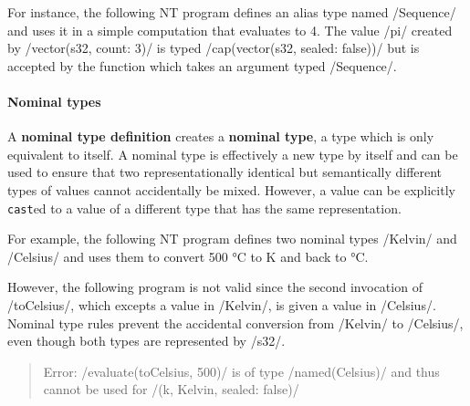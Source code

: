 \documentclass[main.tex]{subfiles}
\begin{document}
For instance, the following NT program defines an alias type named \iil/Sequence/ and uses it in a simple computation that evaluates to 4. The value \iil/pi/ created by \iil/vector(s32, count: 3)/ is typed \iil/cap(vector(s32, sealed: false))/ but is accepted by the function which takes an argument typed \iil/Sequence/.

\paragraph{Nominal types} A \textbf{nominal type definition} creates a \textbf{nominal type}, a type which is only equivalent to itself. A nominal type is effectively a new type by itself and can be used to ensure that two representationally identical but semantically different types of values cannot accidentally be mixed. However, a value can be explicitly \texttt{cast}ed to a value of a different type that has the same representation.

For example, the following NT program defines two nominal types \iil/Kelvin/ and \iil/Celsius/ and uses them to convert 500 °C to K and back to °C.

However, the following program is not valid since the second invocation of \iil/toCelsius/, which excepts a value in \iil/Kelvin/, is given a value in \iil/Celsius/. Nominal type rules prevent the accidental conversion from \iil/Kelvin/ to \iil/Celsius/, even though both types are represented by \iil/s32/.

\begin{quote}
	\ttfamily\footnotesize
	Error: \iil/evaluate(toCelsius, 500)/ is of type \iil/named(Celsius)/ and thus cannot be used for \iil/(k, Kelvin, sealed: false)/
\end{quote}
\end{document}
